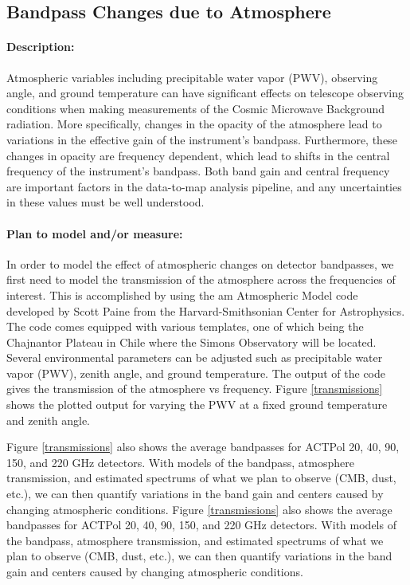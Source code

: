 \subsection{Bandpass Changes due to Atmosphere}

\paragraph{Description:}
Atmospheric variables including precipitable water vapor (PWV), observing angle, and ground temperature can have significant effects on telescope observing conditions when making measurements of the Cosmic Microwave Background radiation.  More specifically, changes in the opacity of the atmosphere lead to variations in the effective gain of the instrument's bandpass.  Furthermore, these changes in opacity are frequency dependent, which lead to shifts in the central frequency of the instrument's bandpass.  Both band gain and central frequency are important factors in the data-to-map analysis pipeline, and any uncertainties in these values must be well understood.

\paragraph{Plan to model and/or measure:}
In order to model the effect of atmospheric changes on detector bandpasses, we first need to model the transmission of the atmosphere across the frequencies of interest.  This is accomplished by using the am Atmospheric Model code developed by Scott Paine from the Harvard-Smithsonian Center for Astrophysics.  The code comes equipped with various templates, one of which being the Chajnantor Plateau in Chile where the Simons Observatory will be located.  Several environmental parameters can be adjusted such as precipitable water vapor (PWV), zenith angle, and ground temperature.  The output of the code gives the transmission of the atmosphere vs frequency.  Figure \ref{transmissions} shows the plotted output for varying the PWV at a fixed ground temperature and zenith angle.   

Figure \ref{transmissions} also shows the average bandpasses for ACTPol 20, 40, 90, 150, and 220 GHz detectors.  With models of the bandpass, atmosphere transmission, and estimated spectrums of what we plan to observe (CMB, dust, etc.), we can then quantify variations in the band gain and centers caused by changing atmospheric conditions.  Figure \ref{transmissions} also shows the average bandpasses for ACTPol 20, 40, 90, 150, and 220 GHz detectors.  With models of the bandpass, atmosphere transmission, and estimated spectrums of what we plan to observe (CMB, dust, etc.), we can then quantify variations in the band gain and centers caused by changing atmospheric conditions.

